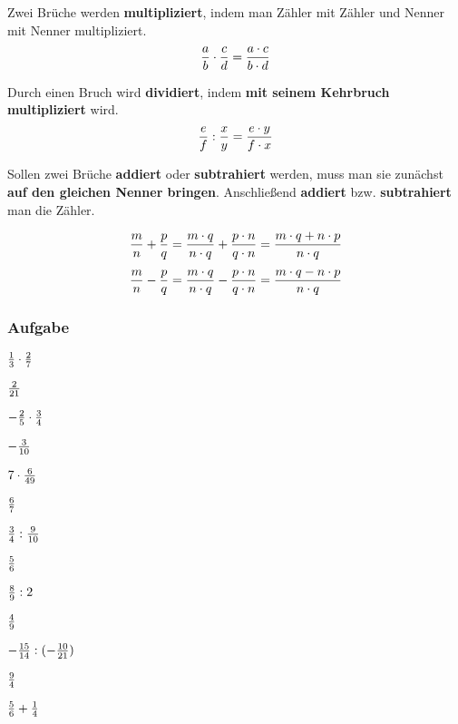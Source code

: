 \documentclass[
  ngerman,
]{book}
\begin{document}
Zwei Brüche werden \textbf{multipliziert}, indem man Zähler mit Zähler und Nenner mit Nenner multipliziert.
\[{a \over b} \cdot {c \over d} = {a \cdot c \over b \cdot d} \]

Durch einen Bruch wird \textbf{dividiert}, indem \textbf{mit seinem Kehrbruch multipliziert} wird.
\[{e \over f} : {x \over y} = {e \cdot y \over f \cdot x}\]

Sollen zwei Brüche \textbf{addiert} oder \textbf{subtrahiert} werden, muss man sie zunächst \textbf{auf den gleichen Nenner bringen}. Anschließend \textbf{addiert} bzw. \textbf{subtrahiert} man die Zähler.

\[{m \over n}+{p \over q} = \frac{m \cdot q}{n \cdot q} + \frac{p \cdot n}{q \cdot n} = {m \cdot q + n \cdot p \over n \cdot q}\]
\[{m \over n}-{p \over q} = \frac{m \cdot q}{n \cdot q} - \frac{p \cdot n}{q \cdot n} = {m \cdot q - n \cdot p \over n \cdot q}\]

\hypertarget{section-6}{%
\subsubsection*{}\label{section-6}}

\hypertarget{aufgabe-2}{%
\subsubsection*{Aufgabe}\label{aufgabe-2}}

\({1 \over 3}\cdot{2 \over 7}\)

\leavevmode\hypertarget{toggleText17}{}%
\(2 \over 21\)

\(-{2 \over 5}\cdot{3 \over 4}\)

\leavevmode\hypertarget{toggleText18}{}%
\(-{3 \over 10}\)

\(7\cdot{6 \over 49}\)

\leavevmode\hypertarget{toggleText19}{}%
\(6 \over 7\)

\({3 \over 4}:{9 \over 10}\)

\leavevmode\hypertarget{toggleText20}{}%
\(5 \over 6\)

\({8 \over 9}:2\)

\leavevmode\hypertarget{toggleText21}{}%
\(4 \over 9\)

\(-{15 \over 14}:(-{10 \over 21})\)

\leavevmode\hypertarget{toggleText22}{}%
\(9 \over 4\)

\({5 \over 6}+{1 \over 4}\)
\end{document}
